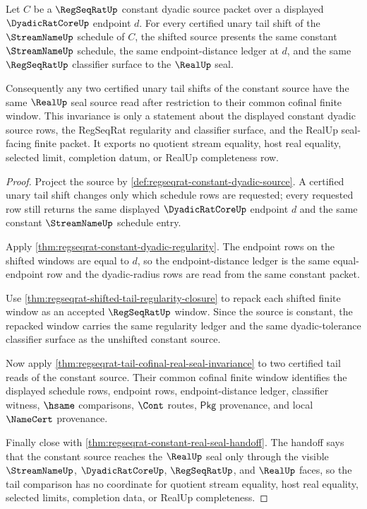 \begin{theorem}
\label{thm:regseqrat-constant-tail-seal-invariance}
Let $C$ be a $\RegSeqRatUp$ constant dyadic source packet over a displayed
$\DyadicRatCoreUp$ endpoint $d$. For every certified unary tail shift of the
$\StreamNameUp$ schedule of $C$, the shifted source presents the same constant
$\StreamNameUp$ schedule, the same endpoint-distance ledger at $d$, and the
same $\RegSeqRatUp$ classifier surface to the $\RealUp$ seal.

Consequently any two certified unary tail shifts of the constant source have
the same $\RealUp$ seal source read after restriction to their common cofinal
finite window. This invariance is only a statement about the displayed
constant dyadic source rows, the RegSeqRat regularity and classifier surface,
and the RealUp seal-facing finite packet. It exports no quotient stream
equality, host real equality, selected limit, completion datum, or RealUp
completeness row.
\end{theorem}
\begin{proof}
Project the source by
\autoref{def:regseqrat-constant-dyadic-source}. A certified unary tail shift
changes only which schedule rows are requested; every requested row still
returns the same displayed $\DyadicRatCoreUp$ endpoint $d$ and the same
constant $\StreamNameUp$ schedule entry.

Apply \autoref{thm:regseqrat-constant-dyadic-regularity}. The endpoint rows on
the shifted windows are equal to $d$, so the endpoint-distance ledger is the
same equal-endpoint row and the dyadic-radius rows are read from the same
constant packet.

Use \autoref{thm:regseqrat-shifted-tail-regularity-closure} to repack each
shifted finite window as an accepted $\RegSeqRatUp$ window. Since the source is
constant, the repacked window carries the same regularity ledger and the same
dyadic-tolerance classifier surface as the unshifted constant source.

Now apply \autoref{thm:regseqrat-tail-cofinal-real-seal-invariance} to two
certified tail reads of the constant source. Their common cofinal finite
window identifies the displayed schedule rows, endpoint rows, endpoint-distance
ledger, classifier witness, $\hsame$ comparisons, $\Cont$ routes,
$\mathsf{Pkg}$ provenance, and local $\NameCert$ provenance.

Finally close with
\autoref{thm:regseqrat-constant-real-seal-handoff}. The handoff says that the
constant source reaches the $\RealUp$ seal only through the visible
$\StreamNameUp$, $\DyadicRatCoreUp$, $\RegSeqRatUp$, and $\RealUp$ faces, so
the tail comparison has no coordinate for quotient stream equality, host real
equality, selected limits, completion data, or RealUp completeness.
\end{proof}
